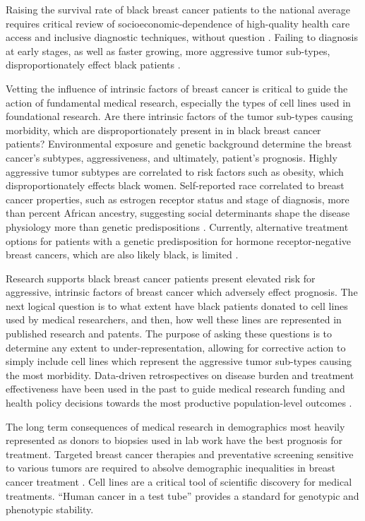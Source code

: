 \documentclass[11pt]{article}
\begin{document}
Raising the survival rate of black breast cancer patients to the national average requires critical review of socioeconomic-dependence of high-quality health care access and inclusive diagnostic techniques, without question \cite{shavers2003racial}. Failing to diagnosis at early stages, as well as faster growing, more aggressive tumor sub-types, disproportionately effect black patients \cite{batina2013variation}. 

Vetting the influence of intrinsic factors of breast cancer is critical to guide the action of fundamental medical research, especially the types of cell lines used in foundational research. Are there intrinsic factors of the tumor sub-types causing morbidity, which are disproportionately present in in black breast cancer patients? Environmental exposure and genetic background determine the breast cancer's subtypes, aggressiveness, and ultimately, patient's prognosis. Highly aggressive tumor subtypes are correlated to risk factors such as obesity, which disproportionately effects black women. Self-reported race correlated to breast cancer properties, such as estrogen receptor status and stage of diagnosis, more than percent African ancestry, suggesting social determinants shape the disease physiology more than genetic predispositions \cite{reding2012examination}. Currently, alternative treatment options for patients with a genetic predisposition for hormone receptor-negative breast cancers, which are also likely black, is  limited \cite{huo2009population}.

Research supports black breast cancer patients present elevated risk for aggressive, intrinsic factors of breast cancer which adversely effect prognosis. The next logical question is to what extent have black patients donated to cell lines used by medical researchers, and then, how well these lines are represented in published research and patents. The purpose of asking these questions is to determine any extent to under-representation, allowing for corrective action to simply include cell lines which represent the aggressive tumor sub-types causing the most morbidity. Data-driven retrospectives on disease burden and treatment effectiveness have been used in the past to guide medical research funding and health policy decisions towards the most productive population-level outcomes \cite{kim2016cancer}. 

The long term consequences of medical research in demographics most heavily represented as donors to biopsies used in lab work have the best prognosis for treatment. Targeted breast cancer therapies and preventative screening sensitive to various tumors are required to absolve demographic inequalities in breast cancer treatment \cite{batina2013variation}. Cell lines are a critical tool of scientific discovery for medical treatments. ``Human cancer in a test tube'' provides a standard for genotypic and phenotypic stability. 
\end{document}
